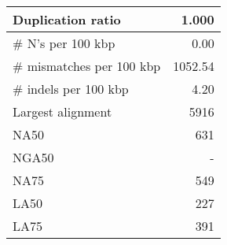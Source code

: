 \documentclass[12pt,a4paper]{article}
\begin{document}
\begin{table}[ht]
\begin{center}
\begin{tabular}{|l*{1}{|r}|}
Duplication ratio & 1.000 \\ \hline
\# N's per 100 kbp & 0.00 \\ \hline
\# mismatches per 100 kbp & 1052.54 \\ \hline
\# indels per 100 kbp & 4.20 \\ \hline
Largest alignment & 5916 \\ \hline
NA50 & 631 \\ \hline
NGA50 & - \\ \hline
NA75 & 549 \\ \hline
LA50 & 227 \\ \hline
LA75 & 391 \\ \hline
\end{tabular}
\end{center}
\end{table}
\end{document}
